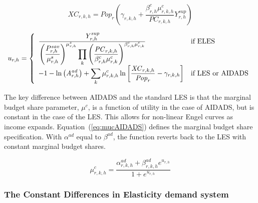 \documentclass[11pt,letterpaper]{report}
\begin{document}
\begin{equation}
\label{eq:xcELES}
\mathit{XC}_{r,k,h} =
   \mathit{Pop}_r \left(
      \gamma_{r,k,h} + \frac{\beta^c_{r,h} \mu^c_{r,k,h}}
         {\mathit{PC}_{r,k,h}} \mathit{Y}^{sup}_{r,h}
   \right)
\end{equation}

\begin{equation}
\label{eq:uELES}
u_{r,h} =
   \left\{
      \begin{array}{l l}
         \frac {\displaystyle \mathit{Y}^{\mathit{sup}}_{r,h}}
            {\displaystyle{ \left(\frac{P^{\mathit{sav}}_{r,h}}{\mu^s_{r,h}}
               \right)^{\mu^s_{r,h}}}
               \prod_k{
                  \left(
                     \frac{\mathit{PC}_{r,k,h}} {\beta^c_{r,h}\mu^c_{r,k}}
                  \right)^{\beta^c_{r,h}\mu^c_{r,k}
               }
            }}
         & \textrm{if ELES} \\
         \displaystyle -1 - \ln{\left(\mathit{A}^{\mathit{ad}}_{r,h}\right)}
            +  \sum_k{ \mu^c_{r,k,h}
            \ln{\left[\frac{\mathit{XC}_{r,k,h}}{\mathit{Pop}_r}
            - \gamma_{r,k,h}\right]}}
         &  \textrm{if LES or AIDADS} \\
      \end{array}
   \right.
\end{equation}

The key difference between AIDADS and the standard LES is that the marginal
budget share parameter, $\mu^c$, is a function of utility in the case of AIDADS,
but is constant in the case of the LES. This allows for non-linear Engel curves
as income expands. Equation~(\ref{eq:mucAIDADS}) defines the marginal budget
share specification. With $\alpha^{\mathit{ad}}$ equal to $\beta^{\mathit{ad}}$,
the function reverts back to the LES with constant marginal budget shares.

\begin{equation}
\label{eq:mucAIDADS}
\mu^c_{r,k,h} =
   \frac {\alpha^{\mathit{ad}}_{r,k,h}
            + \beta^{\mathit{ad}}_{r,k,h} e^{{u_{r,h}}}}
         {1 + e^{{u_{r,h}}}}
\end{equation}

\subsubsection{The Constant Differences in Elasticity demand system}
\end{document}
